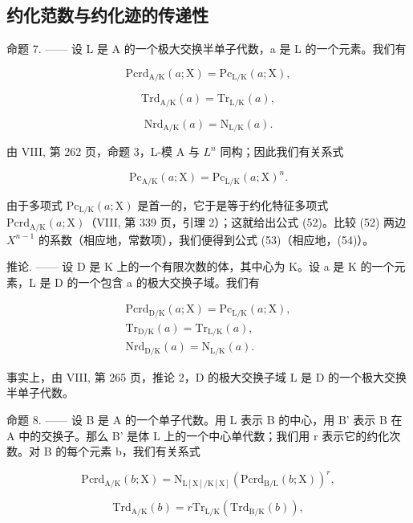 \subsection{约化范数与约化迹的传递性}

命题 7. —— 设 L 是 A 的一个极大交换半单子代数，a 是 L 的一个元素。我们有

\[
\mathrm{Pcrd} _ {\mathrm{A/K}} (a; \mathrm{X}) = \mathrm{Pc} _ {\mathrm{L/K}} (a; \mathrm{X}),\tag{52}
\]

\[
\mathrm{Trd} _ {\mathrm{A/K}} (a) = \mathrm{Tr} _ {\mathrm{L/K}} (a),\tag{53}
\]

\[
\mathrm{Nrd} _ {\mathrm{A/K}} (a) = \mathrm{N} _ {\mathrm{L/K}} (a).\tag{54}
\]

由 VIII, 第 262 页，命题 3，L-模 A 与 \(L^{n}\) 同构；因此我们有关系式

\[
\mathrm{Pc} _ {\mathrm{A/K}} (a; \mathrm{X}) = \mathrm{Pc} _ {\mathrm{L/K}} (a; \mathrm{X}) ^ {n}.
\]

由于多项式 \(\mathrm{Pc}_{\mathrm{L}/\mathrm{K}}(a;\mathrm{X})\) 是首一的，它于是等于约化特征多项式 \(\mathrm{Pcrd}_{\mathrm{A}/\mathrm{K}}(a;\mathrm{X})\)（VIII, 第 339 页，引理 2）；这就给出公式 (52)。比较 (52) 两边 \(X^{n-1}\) 的系数（相应地，常数项），我们便得到公式 (53)（相应地，(54)）。

推论. —— 设 D 是 K 上的一个有限次数的体，其中心为 K。设 a 是 K 的一个元素，L 是 D 的一个包含 a 的极大交换子域。我们有

\[
\begin{array}{c} \mathrm {Pcrd_ {D / K}} (a; \mathrm{X}) = \mathrm {Pc_ {L / K}} (a; \mathrm{X}), \\ \mathrm{Tr} _ {\mathrm{D/K}} (a) = \mathrm{Tr} _ {\mathrm{L/K}} (a), \\ \mathrm{Nrd} _ {\mathrm{D/K}} (a) = \mathrm{N} _ {\mathrm{L/K}} (a). \end{array}\tag{55}
\]

事实上，由 VIII, 第 265 页，推论 2，D 的极大交换子域 L 是 D 的一个极大交换半单子代数。

命题 8. —— 设 B 是 A 的一个单子代数。用 L 表示 B 的中心，用 B' 表示 B 在 A 中的交换子。那么 B' 是体 L 上的一个中心单代数；我们用 r 表示它的约化次数。对 B 的每个元素 b，我们有关系式

\[
\mathrm{Pcrd} _ {\mathrm{A/K}} (b; \mathrm{X}) = \mathrm{N} _ {\mathrm{L[X]/K[X]}} (\mathrm{Pcrd} _ {\mathrm{B/L}} (b; \mathrm{X})) ^ {r},\tag{56}
\]

\[
\mathrm{Trd} _ {\mathrm{A/K}} (b) = r \mathrm{Tr} _ {\mathrm{L/K}} (\mathrm{Trd} _ {\mathrm{B/K}} (b)),\tag{57}
\]

